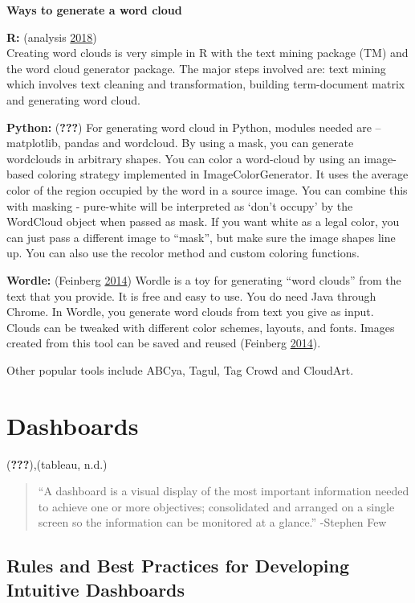 \documentclass[]{book}
\theoremstyle{definition}
\theoremstyle{definition}
\theoremstyle{definition}
\theoremstyle{remark}
\begin{document}
\textbf{Ways to generate a word cloud}

\textbf{R:} (analysis \protect\hyperlink{ref-r}{2018})\\
Creating word clouds is very simple in R with the text mining package
(TM) and the word cloud generator package. The major steps involved are:
text mining which involves text cleaning and transformation, building
term-document matrix and generating word cloud.

\textbf{Python:} ({\textbf{???}}) For generating word cloud in Python,
modules needed are -- matplotlib, pandas and wordcloud. By using a mask,
you can generate wordclouds in arbitrary shapes. You can color a
word-cloud by using an image-based coloring strategy implemented in
ImageColorGenerator. It uses the average color of the region occupied by
the word in a source image. You can combine this with masking -
pure-white will be interpreted as `don't occupy' by the WordCloud object
when passed as mask. If you want white as a legal color, you can just
pass a different image to ``mask'', but make sure the image shapes line
up. You can also use the recolor method and custom coloring functions.

\textbf{Wordle:} (Feinberg \protect\hyperlink{ref-wordle}{2014}) Wordle
is a toy for generating ``word clouds'' from the text that you provide.
It is free and easy to use. You do need Java through Chrome. In Wordle,
you generate word clouds from text you give as input. Clouds can be
tweaked with different color schemes, layouts, and fonts. Images created
from this tool can be saved and reused (Feinberg
\protect\hyperlink{ref-wordle}{2014}).

Other popular tools include ABCya, Tagul, Tag Crowd and CloudArt.

\section{Dashboards}\label{dashboards}

({\textbf{???}}),(tableau, n.d.)

\begin{quote}
``A dashboard is a visual display of the most important information
needed to achieve one or more objectives; consolidated and arranged on a
single screen so the information can be monitored at a glance.''
-Stephen Few
\end{quote}

\subsection{Rules and Best Practices for Developing Intuitive
Dashboards}\label{rules-and-best-practices-for-developing-intuitive-dashboards}
\end{document}
